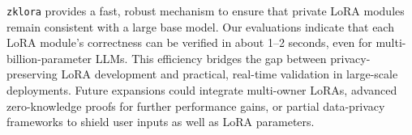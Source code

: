 \documentclass[11pt]{article}
\begin{document}
\texttt{zklora} provides a fast, robust mechanism to ensure that private LoRA modules remain consistent with a large base model. Our evaluations indicate that each LoRA module’s correctness can be verified in about 1--2 seconds, even for multi-billion-parameter LLMs. This efficiency bridges the gap between privacy-preserving LoRA development and practical, real-time validation in large-scale deployments. Future expansions could integrate multi-owner LoRAs, advanced zero-knowledge proofs for further performance gains, or partial data-privacy frameworks to shield user inputs as well as LoRA parameters.



\end{document}
